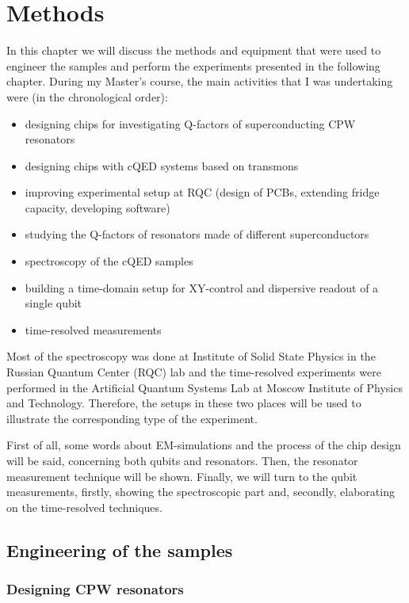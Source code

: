 \chapter{Methods}

In this chapter we will discuss the methods and equipment that were used to engineer the samples and perform the experiments presented in the following chapter. During my Master's course, the main activities that I was undertaking were (in the chronological order):
\begin{itemize}
\item designing chips for investigating Q-factors of superconducting CPW resonators
\item designing chips with cQED systems based on transmons
\item improving experimental setup at RQC (design of PCBs, extending fridge capacity, developing software)
\item studying the Q-factors of resonators made of different superconductors
\item spectroscopy of the cQED samples
\item building a time-domain setup for XY-control and dispersive readout of a single qubit
\item time-resolved measurements
\end{itemize}  

Most of the spectroscopy was done at Institute of Solid State Physics in the Russian Quantum Center (RQC) lab and the time-resolved experiments were performed in the Artificial Quantum Systems Lab at Moscow Institute of Physics and Technology. Therefore, the setups in these two places will be used to illustrate the corresponding type of the experiment. 

First of all, some words about EM-simulations and the process of the chip design will be said, concerning both qubits and resonators. Then, the resonator measurement technique will be shown. Finally, we will turn to the qubit measurements, firstly, showing the spectroscopic part and, secondly, elaborating on the time-resolved techniques.

\section{Engineering of the samples}

\subsection{Designing CPW resonators}

